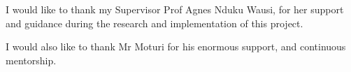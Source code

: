 I would like to thank my Supervisor Prof Agnes Nduku Wausi, for her support and guidance during the research and implementation of this project.

I would also like to thank Mr Moturi for his enormous support, and continuous mentorship.


